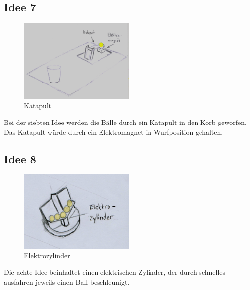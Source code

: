 \subsection{Idee 7}
\begin{figure}[h!]
	\centering
	\includegraphics[width=0.5\textwidth]{../../fig/EM-Katapult.jpg}
	\caption{Katapult}
	\label{fig:katapult}
\end{figure}
Bei der siebten Idee werden die Bälle durch ein Katapult in den Korb geworfen. Das Katapult würde durch ein Elektromagnet in Wurfposition gehalten.

\subsection{Idee 8}
\begin{figure}[h!]
	\centering
	\includegraphics[width=0.5\textwidth]{../../fig/Elektrozylindergeraet.jpg}
	\caption{Elektrozylinder}
	\label{fig:elektrozylinder}
\end{figure}
Die achte Idee beinhaltet einen elektrischen Zylinder, der durch schnelles ausfahren jeweils einen Ball beschleunigt.
